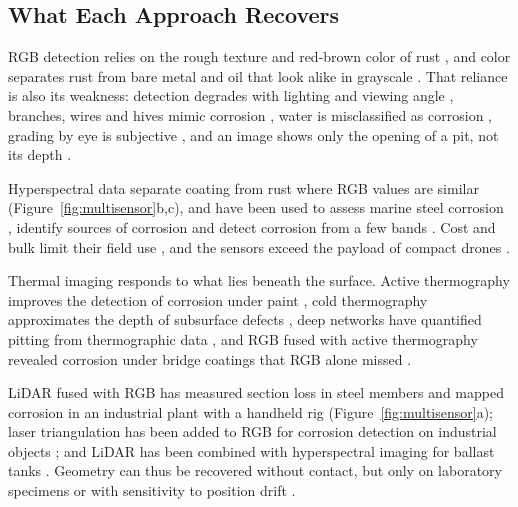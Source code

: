 \subsection{What Each Approach Recovers}

RGB detection relies on the rough texture and red-brown color of rust
\citep{Rahman2021,HerndonTien2025}, and color separates rust from bare metal and
oil that look alike in grayscale \citep{Hu2023}. That reliance is also its
weakness: detection degrades with lighting and viewing angle
\citep{Hu2023,Yu2023,HerndonTien2025}, branches, wires and hives mimic corrosion
\citep{HerndonTien2025}, water is misclassified as corrosion \citep{Rahman2021},
grading by eye is subjective \citep{Li2024b}, and an image shows only the opening
of a pit, not its depth \citep{Suzuki2026}.

Hyperspectral data separate coating from rust where RGB values are similar
\citep{PallasEnguita2025} (Figure~\ref{fig:multisensor}b,c), and have been used to
assess marine steel corrosion \citep{Arias2025}, identify sources of corrosion
\citep{Lavadiya2022} and detect corrosion from a few bands
\citep{Hernndez-Surez2026}. Cost and bulk limit their field use \citep{Tang2025},
and the sensors exceed the payload of compact drones \citep{PallasEnguita2025}.

Thermal imaging responds to what lies beneath the surface. Active thermography
improves the detection of corrosion under paint \citep{Elizalde2023}, cold
thermography approximates the depth of subsurface defects
\citep{Doshvarpassand2022}, deep networks have quantified pitting from
thermographic data \citep{Liu2021}, and RGB fused with active thermography
revealed corrosion under bridge coatings that RGB alone missed \citep{Lim2021}.

LiDAR fused with RGB has measured section loss in steel members
\citep{Maru2025} and mapped corrosion in an industrial plant with a handheld rig
\citep{PimenteldeFigueiredo2025} (Figure~\ref{fig:multisensor}a); laser
triangulation has been added to RGB for corrosion detection on industrial objects
\citep{Haitz2022}; and LiDAR has been combined with hyperspectral imaging for
ballast tanks \citep{PallasEnguita2025}. Geometry can thus be recovered without
contact, but only on laboratory specimens \citep{Maru2025,PallasEnguita2025} or
with sensitivity to position drift \citep{PimenteldeFigueiredo2025}.

